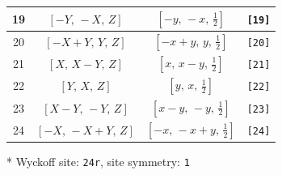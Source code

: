 \documentclass[fleqn,8pt]{jsarticle}
\begin{document}
\begin{longtable}{cccc}
19 & $\left[ - Y,\, - X,\, Z \right]$ & $\left[ - y,\, - x,\, \frac{1}{2} \right]$ & {\tt [19]} \\ \hline
20 & $\left[ - X + Y,\, Y,\, Z \right]$ & $\left[ - x + y,\, y,\, \frac{1}{2} \right]$ & {\tt [20]} \\ \hline
21 & $\left[ X,\, X - Y,\, Z \right]$ & $\left[ x,\, x - y,\, \frac{1}{2} \right]$ & {\tt [21]} \\ \hline
22 & $\left[ Y,\, X,\, Z \right]$ & $\left[ y,\, x,\, \frac{1}{2} \right]$ & {\tt [22]} \\ \hline
23 & $\left[ X - Y,\, - Y,\, Z \right]$ & $\left[ x - y,\, - y,\, \frac{1}{2} \right]$ & {\tt [23]} \\ \hline
24 & $\left[ - X,\, - X + Y,\, Z \right]$ & $\left[ - x,\, - x + y,\, \frac{1}{2} \right]$ & {\tt [24]} \\
\end{longtable}
* Wyckoff site: {\tt 24r}, site symmetry: {\tt 1}
\renewcommand{\arraystretch}{1.2}
\end{document}

